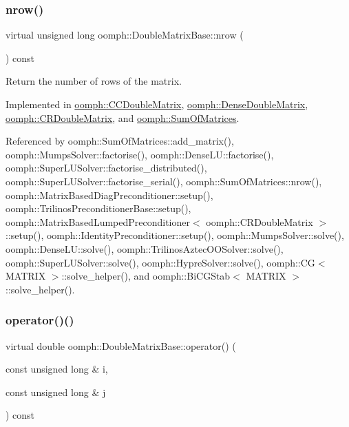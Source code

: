 \subsubsection{\texorpdfstring{nrow()}{nrow()}}
{\footnotesize\ttfamily virtual unsigned long oomph\+::\+Double\+Matrix\+Base\+::nrow (\begin{DoxyParamCaption}{ }\end{DoxyParamCaption}) const\hspace{0.3cm}{\ttfamily [pure virtual]}}



Return the number of rows of the matrix. 



Implemented in \hyperlink{classoomph_1_1CCDoubleMatrix_ab541153fa5ab2c1bc18e5339bacadfb9}{oomph\+::\+C\+C\+Double\+Matrix}, \hyperlink{classoomph_1_1DenseDoubleMatrix_ab67993d1a41ca5ddf05c8210673723f0}{oomph\+::\+Dense\+Double\+Matrix}, \hyperlink{classoomph_1_1CRDoubleMatrix_abd8d231b0549540144b4739a667b1e75}{oomph\+::\+C\+R\+Double\+Matrix}, and \hyperlink{classoomph_1_1SumOfMatrices_a5d3b790f7e4f1bce927ecfb61844a52a}{oomph\+::\+Sum\+Of\+Matrices}.



Referenced by oomph\+::\+Sum\+Of\+Matrices\+::add\+\_\+matrix(), oomph\+::\+Mumps\+Solver\+::factorise(), oomph\+::\+Dense\+L\+U\+::factorise(), oomph\+::\+Super\+L\+U\+Solver\+::factorise\+\_\+distributed(), oomph\+::\+Super\+L\+U\+Solver\+::factorise\+\_\+serial(), oomph\+::\+Sum\+Of\+Matrices\+::nrow(), oomph\+::\+Matrix\+Based\+Diag\+Preconditioner\+::setup(), oomph\+::\+Trilinos\+Preconditioner\+Base\+::setup(), oomph\+::\+Matrix\+Based\+Lumped\+Preconditioner$<$ oomph\+::\+C\+R\+Double\+Matrix $>$\+::setup(), oomph\+::\+Identity\+Preconditioner\+::setup(), oomph\+::\+Mumps\+Solver\+::solve(), oomph\+::\+Dense\+L\+U\+::solve(), oomph\+::\+Trilinos\+Aztec\+O\+O\+Solver\+::solve(), oomph\+::\+Super\+L\+U\+Solver\+::solve(), oomph\+::\+Hypre\+Solver\+::solve(), oomph\+::\+C\+G$<$ M\+A\+T\+R\+I\+X $>$\+::solve\+\_\+helper(), and oomph\+::\+Bi\+C\+G\+Stab$<$ M\+A\+T\+R\+I\+X $>$\+::solve\+\_\+helper().

\mbox{\label{classoomph_1_1DoubleMatrixBase_a20b85f0286f80464f42f0846fede2d77}} 
\subsubsection{\texorpdfstring{operator()()}{operator()()}}
{\footnotesize\ttfamily virtual double oomph\+::\+Double\+Matrix\+Base\+::operator() (\begin{DoxyParamCaption}\item[{const unsigned long \&}]{i,  }\item[{const unsigned long \&}]{j }\end{DoxyParamCaption}) const\hspace{0.3cm}{\ttfamily [pure virtual]}}



